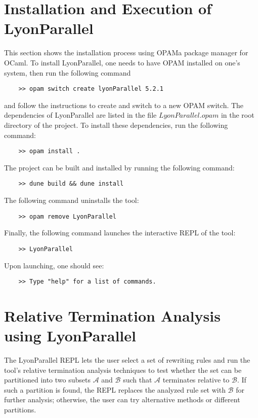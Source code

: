 \section{Installation and Execution of LyonParallel}
\label{lyonparallel:sec:installation}
This section shows the installation process using \colorbox{Ivory2}{OPAM}\textemdash a package manager for OCaml. To install LyonParallel, one needs to have \colorbox{Ivory2}{OPAM} installed on one's system, then 
run the following command
\begin{verbatim}
    >> opam switch create lyonParallel 5.2.1
\end{verbatim}
 and follow the instructions to create and switch to a new \colorbox{Ivory2}{OPAM} switch. 
 The dependencies of LyonParallel are listed in the file \colorbox{Ivory2}{$LyonParallel.opam$} in the root directory of the project. To install these dependencies, run the following command:
\begin{verbatim}
    >> opam install .
\end{verbatim}
The project can be built and installed by running the following command:
\begin{verbatim}
    >> dune build && dune install
\end{verbatim}
The following command uninstalls the tool:
\begin{verbatim}
    >> opam remove LyonParallel
\end{verbatim}
Finally, the following command launches the interactive REPL of the tool:
\begin{verbatim}
    >> LyonParallel
\end{verbatim}
Upon launching, one should see:
\begin{verbatim}
    >> Type "help" for a list of commands.
\end{verbatim}
\section{Relative Termination Analysis using LyonParallel}
\label{lyonparallel:sec:termination}
The LyonParallel REPL lets the user select a set of rewriting rules and run the tool's relative termination analysis techniques to test whether the set can be partitioned into two subsets \(\mathcal{A}\) and \(\mathcal{B}\) such that \(\mathcal{A}\) terminates relative to \(\mathcal{B}\). If such a partition is found, the REPL replaces the analyzed rule set with \(\mathcal{B}\) for further analysis; otherwise, the user can try alternative methods or different partitions.

